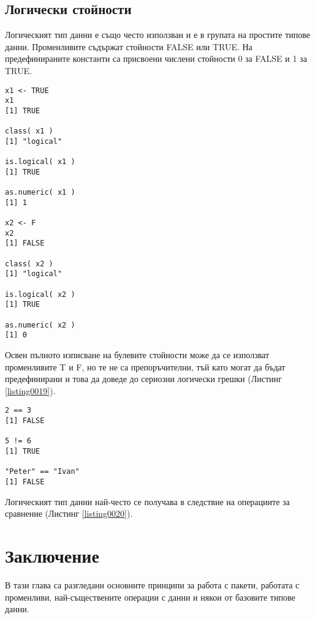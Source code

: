 \subsection{Логически стойности}

Логическият тип данни е също често използван и е в групата на простите типове данни. Променливите съдържат стойности FALSE или TRUE. На предефинираните константи са присвоени числени стойности 0 за FALSE и 1 за TRUE. 

\begin{lstlisting}[caption=Логически тип данни, label=listing0019]
x1 <- TRUE
x1
[1] TRUE

class( x1 )
[1] "logical"

is.logical( x1 )
[1] TRUE

as.numeric( x1 )
[1] 1

x2 <- F
x2
[1] FALSE

class( x2 )
[1] "logical"

is.logical( x2 )
[1] TRUE

as.numeric( x2 )
[1] 0
\end{lstlisting}

Освен пълното изписване на булевите стойности може да се използват променливите T и F, но те не са препоръчителни, тъй като могат да бъдат предефинирани и това да доведе до сериозни логически грешки (Листинг \ref{listing0019}). 

\begin{lstlisting}[caption=Операции за сравнение, label=listing0020]
2 == 3
[1] FALSE

5 != 6
[1] TRUE

"Peter" == "Ivan"
[1] FALSE
\end{lstlisting}

Логическият тип данни най-често се получава в следствие на операциите за сравнение (Листинг \ref{listing0020}).

\section*{Заключение}

В тази глава са разгледани основните принципи за работа с пакети, работата с променливи, най-съществените операции с данни и някои от базовите типове данни. 
